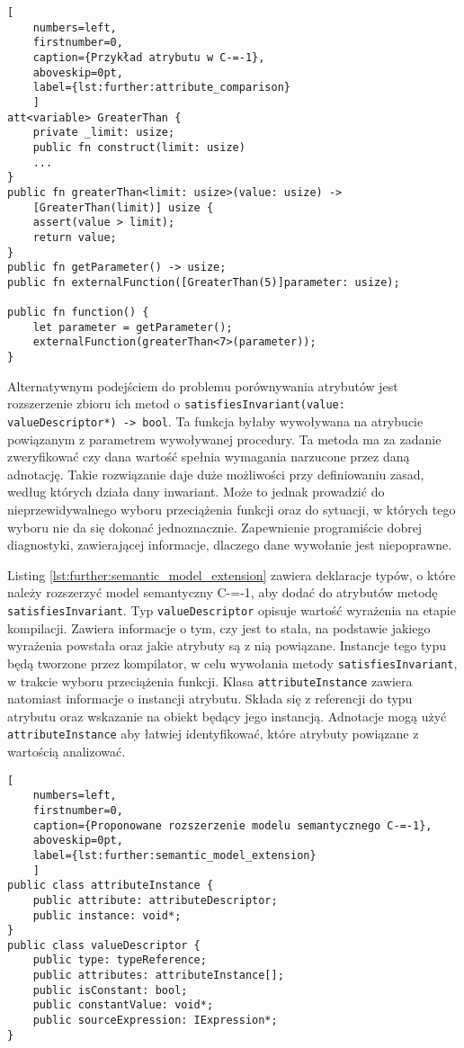 \begin{minipage}{\textwidth}

\begin{lstlisting}[
	numbers=left,
	firstnumber=0,
	caption={Przykład atrybutu w C-=-1},
	aboveskip=0pt,
	label={lst:further:attribute_comparison}
	]
att<variable> GreaterThan {
	private _limit: usize;
	public fn construct(limit: usize)
	...
}
public fn greaterThan<limit: usize>(value: usize) -> 
	[GreaterThan(limit)] usize {
	assert(value > limit);
	return value;
}
public fn getParameter() -> usize;
public fn externalFunction([GreaterThan(5)]parameter: usize);

public fn function() {
	let parameter = getParameter();
	externalFunction(greaterThan<7>(parameter));
}
\end{lstlisting}
\end{minipage}

Alternatywnym podejściem do problemu porównywania atrybutów jest rozszerzenie zbioru ich metod o \lstinline{satisfiesInvariant(value: valueDescriptor*) -> bool}.
Ta funkcja byłaby wywoływana na atrybucie powiązanym z parametrem wywoływanej procedury.
Ta metoda ma za zadanie zweryfikować czy dana wartość spełnia wymagania narzucone przez daną adnotację.
Takie rozwiązanie daje duże możliwości przy definiowaniu zasad, według których działa dany inwariant.
Może to jednak prowadzić do nieprzewidywalnego wyboru przeciążenia funkcji oraz do sytuacji, w których tego wyboru nie da się dokonać jednoznacznie.
Zapewnienie programiście dobrej diagnostyki, zawierającej informacje, dlaczego dane wywołanie jest niepoprawne.

Listing \ref{lst:further:semantic_model_extension} zawiera deklaracje typów, o które należy rozszerzyć model semantyczny C-=-1, aby dodać do atrybutów metodę \lstinline{satisfiesInvariant}.
Typ \lstinline{valueDescriptor} opisuje wartość wyrażenia na etapie kompilacji.
Zawiera informacje o tym, czy jest to stała, na podstawie jakiego wyrażenia powstała oraz jakie atrybuty są z nią powiązane.
Instancje tego typu będą tworzone przez kompilator, w celu wywołania metody \lstinline{satisfiesInvariant}, w trakcie wyboru przeciążenia funkcji.
Klasa \lstinline{attributeInstance} zawiera natomiast informacje o instancji atrybutu.
Składa się z referencji do typu atrybutu oraz wskazanie na obiekt będący jego instancją.
Adnotacje mogą użyć \lstinline{attributeInstance} aby łatwiej identyfikować, które atrybuty powiązane z wartością analizować.

\begin{minipage}{\textwidth}
	
\begin{lstlisting}[
	numbers=left,
	firstnumber=0,
	caption={Proponowane rozszerzenie modelu semantycznego C-=-1},
	aboveskip=0pt,
	label={lst:further:semantic_model_extension}
	]
public class attributeInstance {
	public attribute: attributeDescriptor;
	public instance: void*;
}
public class valueDescriptor {
	public type: typeReference;
	public attributes: attributeInstance[];
	public isConstant: bool;
	public constantValue: void*;
	public sourceExpression: IExpression*;
}
\end{lstlisting}
	
\end{minipage}

